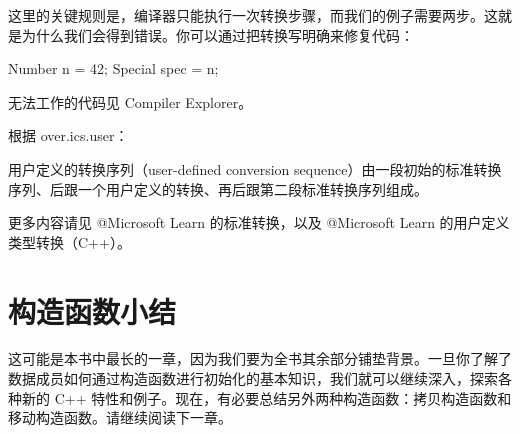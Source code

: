 这里的关键规则是，编译器只能执行一次转换步骤，而我们的例子需要两步。这就是为什么我们会得到错误。你可以通过把转换写明确来修复代码：

\begin{codebox}[cpp]
Number n = 42;
Special spec = n;
\end{codebox}

无法工作的代码见 Compiler Explorer。

根据 over.ics.user：

\begin{myQuote}
用户定义的转换序列（user-defined conversion sequence）由一段初始的标准转换序列、后跟一个用户定义的转换、再后跟第二段标准转换序列组成。
\end{myQuote}

\begin{myInfoBox}
更多内容请见 @Microsoft Learn 的标准转换，以及 @Microsoft Learn 的用户定义类型转换（C++）。
\end{myInfoBox}


\section{构造函数小结}

这可能是本书中最长的一章，因为我们要为全书其余部分铺垫背景。一旦你了解了数据成员如何通过构造函数进行初始化的基本知识，我们就可以继续深入，探索各种新的 C++ 特性和例子。现在，有必要总结另外两种构造函数：拷贝构造函数和移动构造函数。请继续阅读下一章。
